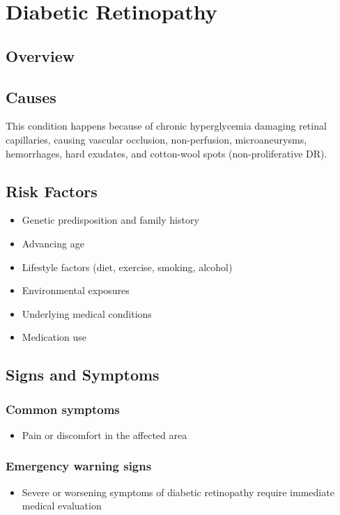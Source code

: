 \chapter{Diabetic Retinopathy}
\label{sec:Diabetic Retinopathy}

\section{Overview}

\section{Causes}
This condition happens because of chronic hyperglycemia damaging retinal capillaries, causing vascular occlusion, non-perfusion, microaneurysms, hemorrhages, hard exudates, and cotton-wool spots (non-proliferative DR).     
\section{Risk Factors}

\begin{itemize}[noitemsep]
  \item Genetic predisposition and family history
  \item Advancing age
  \item Lifestyle factors (diet, exercise, smoking, alcohol)
  \item Environmental exposures
  \item Underlying medical conditions
  \item Medication use
\end{itemize}
\section{Signs and Symptoms}

\subsection{Common symptoms}
\begin{itemize}[noitemsep]
  \item Pain or discomfort in the affected area
  \end{itemize}

\subsection{Emergency warning signs}
\begin{itemize}[noitemsep]
  \item Severe or worsening symptoms of diabetic retinopathy require immediate medical evaluation
\end{itemize}
